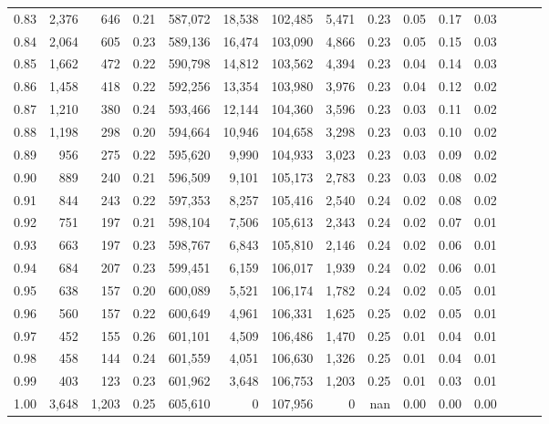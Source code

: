 \begin{tabular}{rrrrrrrrrrrrrrr}
0.83 &   2,376 &     646 &  0.21 &  587,072 &   18,538 &  102,485 &    5,471 &  0.23 &  0.05 &  0.17 &      0.03 \\
0.84 &   2,064 &     605 &  0.23 &  589,136 &   16,474 &  103,090 &    4,866 &  0.23 &  0.05 &  0.15 &      0.03 \\
0.85 &   1,662 &     472 &  0.22 &  590,798 &   14,812 &  103,562 &    4,394 &  0.23 &  0.04 &  0.14 &      0.03 \\
0.86 &   1,458 &     418 &  0.22 &  592,256 &   13,354 &  103,980 &    3,976 &  0.23 &  0.04 &  0.12 &      0.02 \\
0.87 &   1,210 &     380 &  0.24 &  593,466 &   12,144 &  104,360 &    3,596 &  0.23 &  0.03 &  0.11 &      0.02 \\
0.88 &   1,198 &     298 &  0.20 &  594,664 &   10,946 &  104,658 &    3,298 &  0.23 &  0.03 &  0.10 &      0.02 \\
0.89 &     956 &     275 &  0.22 &  595,620 &    9,990 &  104,933 &    3,023 &  0.23 &  0.03 &  0.09 &      0.02 \\
0.90 &     889 &     240 &  0.21 &  596,509 &    9,101 &  105,173 &    2,783 &  0.23 &  0.03 &  0.08 &      0.02 \\
0.91 &     844 &     243 &  0.22 &  597,353 &    8,257 &  105,416 &    2,540 &  0.24 &  0.02 &  0.08 &      0.02 \\
0.92 &     751 &     197 &  0.21 &  598,104 &    7,506 &  105,613 &    2,343 &  0.24 &  0.02 &  0.07 &      0.01 \\
0.93 &     663 &     197 &  0.23 &  598,767 &    6,843 &  105,810 &    2,146 &  0.24 &  0.02 &  0.06 &      0.01 \\
0.94 &     684 &     207 &  0.23 &  599,451 &    6,159 &  106,017 &    1,939 &  0.24 &  0.02 &  0.06 &      0.01 \\
0.95 &     638 &     157 &  0.20 &  600,089 &    5,521 &  106,174 &    1,782 &  0.24 &  0.02 &  0.05 &      0.01 \\
0.96 &     560 &     157 &  0.22 &  600,649 &    4,961 &  106,331 &    1,625 &  0.25 &  0.02 &  0.05 &      0.01 \\
0.97 &     452 &     155 &  0.26 &  601,101 &    4,509 &  106,486 &    1,470 &  0.25 &  0.01 &  0.04 &      0.01 \\
0.98 &     458 &     144 &  0.24 &  601,559 &    4,051 &  106,630 &    1,326 &  0.25 &  0.01 &  0.04 &      0.01 \\
0.99 &     403 &     123 &  0.23 &  601,962 &    3,648 &  106,753 &    1,203 &  0.25 &  0.01 &  0.03 &      0.01 \\
1.00 &   3,648 &   1,203 &  0.25 &  605,610 &        0 &  107,956 &        0 &   nan &  0.00 &  0.00 &      0.00 \\
\bottomrule
\end{tabular}

